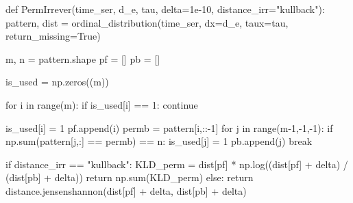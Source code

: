 \documentclass[
  letterpaper,
]{report}
\newenvironment{Shaded}{\begin{snugshade}}{\end{snugshade}}
\newcommand{\BuiltInTok}[1]{\textcolor[rgb]{0.00,0.23,0.31}{#1}}
\newcommand{\ControlFlowTok}[1]{\textcolor[rgb]{0.00,0.23,0.31}{#1}}
\newcommand{\DecValTok}[1]{\textcolor[rgb]{0.68,0.00,0.00}{#1}}
\newcommand{\FloatTok}[1]{\textcolor[rgb]{0.68,0.00,0.00}{#1}}
\newcommand{\KeywordTok}[1]{\textcolor[rgb]{0.00,0.23,0.31}{#1}}
\newcommand{\NormalTok}[1]{\textcolor[rgb]{0.00,0.23,0.31}{#1}}
\newcommand{\OperatorTok}[1]{\textcolor[rgb]{0.37,0.37,0.37}{#1}}
\newcommand{\StringTok}[1]{\textcolor[rgb]{0.13,0.47,0.30}{#1}}
\newcommand{\VariableTok}[1]{\textcolor[rgb]{0.07,0.07,0.07}{#1}}
\begin{document}
\begin{Shaded}
\begin{Highlighting}[]
\KeywordTok{def}\NormalTok{ PermIrrever(time\_ser, d\_e, tau, delta}\OperatorTok{=}\FloatTok{1e{-}10}\NormalTok{, distance\_irr}\OperatorTok{=}\StringTok{"kullback"}\NormalTok{):}
\NormalTok{    pattern, dist }\OperatorTok{=}\NormalTok{ ordinal\_distribution(time\_ser, dx}\OperatorTok{=}\NormalTok{d\_e, taux}\OperatorTok{=}\NormalTok{tau, return\_missing}\OperatorTok{=}\VariableTok{True}\NormalTok{)}
    
\NormalTok{    m, n }\OperatorTok{=}\NormalTok{ pattern.shape}
\NormalTok{    pf }\OperatorTok{=}\NormalTok{ []}
\NormalTok{    pb }\OperatorTok{=}\NormalTok{ []}

\NormalTok{    is\_used }\OperatorTok{=}\NormalTok{ np.zeros((m))}

    \ControlFlowTok{for}\NormalTok{ i }\KeywordTok{in} \BuiltInTok{range}\NormalTok{(m):}
        \ControlFlowTok{if}\NormalTok{ is\_used[i] }\OperatorTok{==} \DecValTok{1}\NormalTok{:}
            \ControlFlowTok{continue}

\NormalTok{        is\_used[i] }\OperatorTok{=} \DecValTok{1}
\NormalTok{        pf.append(i)}
\NormalTok{        permb }\OperatorTok{=}\NormalTok{ pattern[i,::}\OperatorTok{{-}}\DecValTok{1}\NormalTok{]}
        \ControlFlowTok{for}\NormalTok{ j }\KeywordTok{in} \BuiltInTok{range}\NormalTok{(m}\OperatorTok{{-}}\DecValTok{1}\NormalTok{,}\OperatorTok{{-}}\DecValTok{1}\NormalTok{,}\OperatorTok{{-}}\DecValTok{1}\NormalTok{):}
            \ControlFlowTok{if}\NormalTok{ np.}\BuiltInTok{sum}\NormalTok{(pattern[j,:] }\OperatorTok{==}\NormalTok{ permb) }\OperatorTok{==}\NormalTok{ n: }
\NormalTok{                is\_used[j] }\OperatorTok{=} \DecValTok{1}
\NormalTok{                pb.append(j)}
                \ControlFlowTok{break}
    
    \ControlFlowTok{if}\NormalTok{ distance\_irr }\OperatorTok{==} \StringTok{"kullback"}\NormalTok{:}
\NormalTok{        KLD\_perm }\OperatorTok{=}\NormalTok{ dist[pf] }\OperatorTok{*}\NormalTok{ np.log((dist[pf] }\OperatorTok{+}\NormalTok{ delta) }\OperatorTok{/}\NormalTok{ (dist[pb] }\OperatorTok{+}\NormalTok{ delta))}
        \ControlFlowTok{return}\NormalTok{ np.}\BuiltInTok{sum}\NormalTok{(KLD\_perm)   }
    \ControlFlowTok{else}\NormalTok{:}
        \ControlFlowTok{return}\NormalTok{ distance.jensenshannon(dist[pf] }\OperatorTok{+}\NormalTok{ delta, dist[pb] }\OperatorTok{+}\NormalTok{ delta)}
\end{Highlighting}
\end{Shaded}
\end{document}
